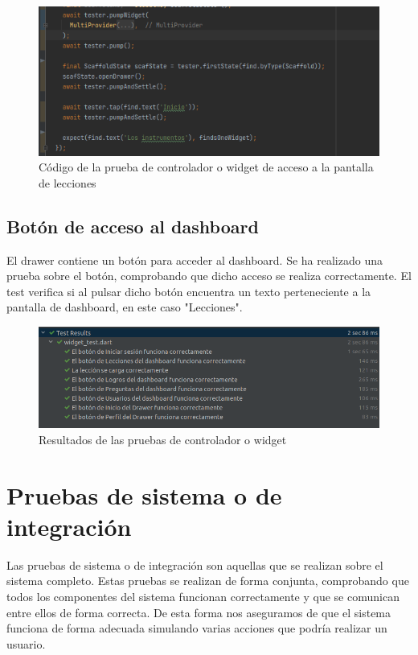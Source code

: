 \begin{figure}[H]
    \centering
    \includegraphics[width=\textwidth]{imagenes/c8/pruebawidget2.png}
    \caption{Código de la prueba de controlador o widget de acceso a la pantalla de lecciones}
    \label{fig:prueba_widget_lecciones}
\end{figure}

\subsection{Botón de acceso al dashboard}
\label{subsec:pruebas-controlador-boton-leccion}
El drawer contiene un botón para acceder al dashboard. Se ha realizado una prueba sobre el botón, comprobando que dicho acceso se realiza correctamente.
El test verifica si al pulsar dicho botón encuentra un texto perteneciente a la pantalla de dashboard, en este caso "Lecciones".


\begin{figure}[H]
    \centering
    \includegraphics[width=\textwidth]{imagenes/c8/pruebawidgets.png}
    \caption{Resultados de las pruebas de controlador o widget}
    \label{fig:prueba_creacion_usuario}
\end{figure}


\section{Pruebas de sistema o de integración}
\label{sec:pruebas-sistema}
Las pruebas de sistema o de integración son aquellas que se realizan sobre el sistema completo. Estas pruebas se realizan de forma conjunta, comprobando que todos los componentes del sistema funcionan correctamente y que se comunican entre ellos de forma correcta.
De esta forma nos aseguramos de que el sistema funciona de forma adecuada simulando varias acciones que podría realizar un usuario.

